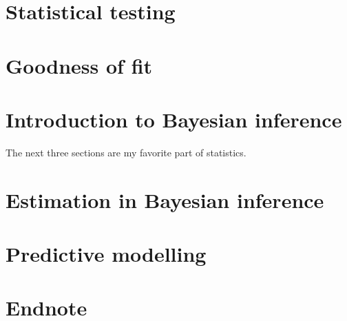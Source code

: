 \documentclass[a4paper]{article}
\begin{document}
\newpage
\section{Statistical testing}

\newpage
\section{Goodness of fit}

\newpage
\section{Introduction to Bayesian inference}
The next three sections are my favorite part of statistics. 

\newpage
\section{Estimation in Bayesian inference}

\newpage
\section{Predictive modelling}
\section{Endnote}
\end{document}
